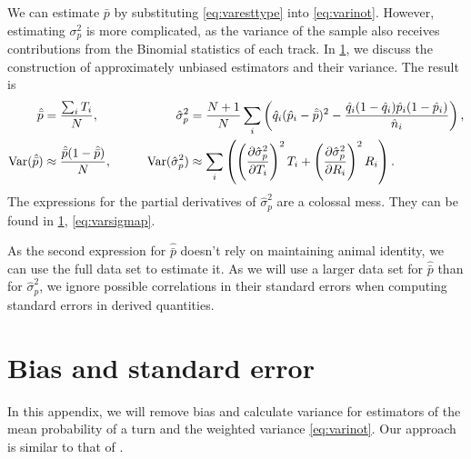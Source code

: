 \documentclass[12pt]{article}
\newcommand{\pdiffc}[3][\rule{0mm}{0mm}]{\left (\frac{\partial #2}{\partial {#3}}\right )_{\!\!#1}}
\DeclareMathOperator{\var}{Var}
\newcommand{\prn}[1]{\left ( #1 \right )}
\begin{document}
We can estimate $\bar{p}$ by substituting \eqref{eq:varesttype} into \eqref{eq:varinot}. However, estimating $\sigma_p^2$ is more complicated, as the variance of the sample also receives contributions from the Binomial statistics of each track. In \ref{sec:varibias}, we discuss the construction of approximately unbiased estimators and their variance. The result is
%
\begin{equation}\label{eq:variests}
  \begin{aligned}
    \hat{\bar{p}} &%
        = \frac{\sum_i T_i}{N},
        &
    \hat{\sigma}_p^2 &= \frac{N+1}{N} \sum_i\prn{ \hat{q}_i(\hat{p}_i-\hat{\bar{p}})^2 - \frac{\hat{q}_i(1-\hat{q}_i)\hat{p}_i(1-\hat{p}_i)}{\hat{n}_i}},
    \\
    \var(\hat{\bar{p}}) &\approx \frac{\hat{\bar{p}}(1-\hat{\bar{p}})}{N},
    &\qquad
    \var(\hat{\sigma}_p^2) &\approx \sum_i\prn{ \pdiffc{\hat{\sigma}_p^2}{T_i}^2 T_i + \pdiffc{\hat{\sigma}_p^2}{R_i}^2 R_i }.
  \end{aligned}
\end{equation}
%
The expressions for the partial derivatives of $\hat{\sigma}_p^2$ are a colossal mess. They can be found in \ref{sec:varibias}, \eqref{eq:varsigmap}.

As the second expression for $\hat{\bar{p}}$ doesn't rely on maintaining animal identity, we can use the full data set to estimate it. As we will use a larger data set for $\hat{\bar{p}}$ than for $\hat{\sigma}_p^2$, we ignore possible correlations in their standard errors when computing standard errors in derived quantities.

\appendix
\renewcommand{\thesection}{Appendix \Alph{section}}

\section{Bias and standard error}\label{sec:varibias}

In this appendix, we will remove bias and calculate variance for estimators of the mean probability of a turn and the weighted variance \eqref{eq:varinot}. Our approach is similar to that of \cite{Roulston1999}.
\end{document}
